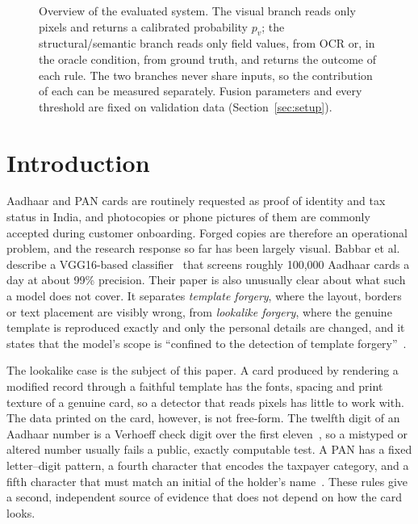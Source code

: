 \documentclass[conference]{IEEEtran}
\begin{document}
\begin{figure}[!t]
{}
\caption{Overview of the evaluated system. The visual branch reads only
pixels and returns a calibrated probability $p_v$; the
structural/semantic branch reads only field values, from OCR or, in the
oracle condition, from ground truth, and returns the outcome of each
rule. The two branches never share inputs, so the contribution of
each can be measured separately. Fusion parameters and
every threshold are fixed on validation data (Section~\ref{sec:setup}).}
\label{fig:overview}
\end{figure}
\section{Introduction}
\label{sec:intro}

Aadhaar and PAN cards are routinely requested as proof of identity and
tax status in India, and photocopies or phone pictures of them are
commonly accepted during customer onboarding. Forged copies are therefore an operational problem, and the
research response so far has been largely visual. Babbar et
al.~\cite{babbar} describe a VGG16-based classifier~\cite{vgg} that
screens roughly 100{,}000 Aadhaar cards a day at about 99\% precision.
Their paper is also unusually clear about what such a model does not
cover. It separates \emph{template forgery}, where the layout, borders
or text placement are visibly wrong, from \emph{lookalike forgery},
where the genuine template is reproduced exactly and only the personal
details are changed, and it states that the model's scope is
``confined to the detection of template forgery''~\cite{babbar}.

The lookalike case is the subject of this paper. A card produced by
rendering a modified record through a faithful template has the fonts,
spacing and print texture of a genuine card, so a detector that reads
pixels has little to work with. The data printed on the card, however,
is not free-form. The twelfth digit of an Aadhaar number is a Verhoeff
check digit over the first eleven~\cite{uidai-scheme,verhoeff}, so a
mistyped or altered number usually fails a public, exactly computable
test. A PAN has a fixed letter--digit pattern, a fourth character that
encodes the taxpayer category, and a fifth character that must match an
initial of the holder's name~\cite{itd-pan,rule114}. These rules give a
second, independent source of evidence that does not depend on how the
card looks.
\end{document}
